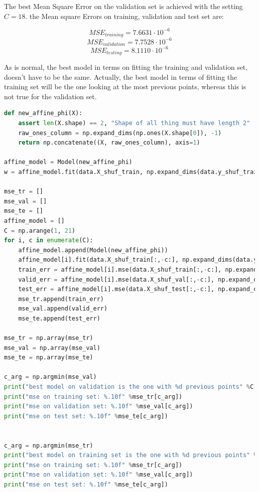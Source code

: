 \documentclass{article}
\begin{document}
The best Mean Square Error on the validation set is achieved with the setting $C=18$. the Mean square Errors on training, validation and test set are:

$$MSE_{training} = 7.6631 \cdot 10^{-6}$$
$$MSE_{validation} = 7.7528 \cdot 10^{-6}$$
$$MSE_{testing} = 8.1110 \cdot 10^{-6}$$

As is normal, the best model in terms on fitting the training and validation set, doesn't have to be the same. Actually, the best model in terms of fitting the training set will be the one looking at the most previous points, whereas this is not true for the validation set.

\begin{lstlisting}[language = Python]
def new_affine_phi(X):
    assert len(X.shape) == 2, "Shape of all thing must have length 2"
    raw_ones_column = np.expand_dims(np.ones(X.shape[0]), -1)
    return np.concatenate((X, raw_ones_column), axis=1)

affine_model = Model(new_affine_phi)
w = affine_model.fit(data.X_shuf_train, np.expand_dims(data.y_shuf_train, -1))

mse_tr = []
mse_val = []
mse_te = []
affine_model = []
C = np.arange(1, 21)
for i, c in enumerate(C):
    affine_model.append(Model(new_affine_phi))
    affine_model[i].fit(data.X_shuf_train[:,-c:], np.expand_dims(data.y_shuf_train, -1))
    train_err = affine_model[i].mse(data.X_shuf_train[:,-c:], np.expand_dims(data.y_shuf_train, -1))
    valid_err = affine_model[i].mse(data.X_shuf_val[:,-c:], np.expand_dims(data.y_shuf_val, -1))
    test_err = affine_model[i].mse(data.X_shuf_test[:,-c:], np.expand_dims(data.y_shuf_test, -1))
    mse_tr.append(train_err)
    mse_val.append(valid_err)
    mse_te.append(test_err)
    
mse_tr = np.array(mse_tr)
mse_val = np.array(mse_val)
mse_te = np.array(mse_te)

c_arg = np.argmin(mse_val)
print("best model on validation is the one with %d previous points" %C[c_arg])
print("mse on training set: %.10f" %mse_tr[c_arg])
print("mse on validation set: %.10f" %mse_val[c_arg])
print("mse on test set: %.10f" %mse_te[c_arg])


c_arg = np.argmin(mse_tr)
print("best model on training set is the one with %d previous points" %C[c_arg])
print("mse on training set: %.10f" %mse_tr[c_arg])
print("mse on validation set: %.10f" %mse_val[c_arg])
print("mse on test set: %.10f" %mse_te[c_arg])
\end{lstlisting}
\end{document}
